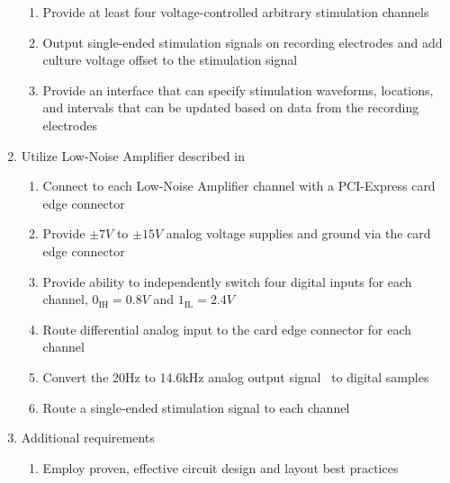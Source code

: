 \begin{enumerate}
\begin{enumerate}
	\item Provide at least four voltage-controlled arbitrary stimulation channels
	
	\item Output single-ended stimulation signals on recording electrodes and add culture voltage offset to the stimulation signal
	
	\item Provide an interface that can specify stimulation waveforms, locations, and intervals that can be updated based on data from the recording electrodes
	
	\end{enumerate}

\item Utilize Low-Noise Amplifier described in~\cite{StahlMSEE}

	\begin{enumerate}
	
	\item Connect to each Low-Noise Amplifier channel with a PCI-Express card edge connector
	
	\item Provide $\pm 7\unit{V}$ to $\pm 15\unit{V}$ analog voltage supplies and ground via the card edge connector
	
	\item Provide ability to independently switch four digital inputs for each channel, $0_{\mathrm{IH}}=0.8\unit{V}$ and $1_{\mathrm{IL}}=2.4\unit{V}$
	
	\item Route differential analog input to the card edge connector for each channel
	
	\item Convert the 20Hz to 14.6kHz analog output signal~\cite{StahlMSEE} to digital samples %
	
	\item Route a single-ended stimulation signal to each channel
	
	\end{enumerate}
	
\item Additional requirements

	\begin{enumerate}
	
	
	\item Employ proven, effective circuit design and layout best practices
	
	
	\end{enumerate}
	
\end{enumerate}
